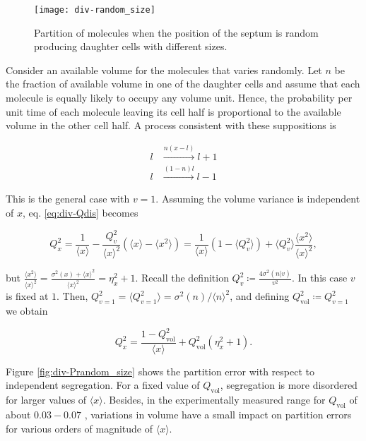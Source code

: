 \begin{figure}[H]
  \centering
  \texttt{[image: div-random\_size]}
  \caption[Partition of molecules with random size of the daughter cells]{\label{fig:div-random_size}Partition of molecules when the position of the septum is random producing daughter cells with different sizes.}
\end{figure}

Consider an available volume for the molecules that varies randomly. Let $n$ be the fraction of available volume in one of the daughter cells and assume that each molecule is equally likely to occupy any volume unit. Hence, the probability per unit time of each molecule leaving its cell half is proportional to the available volume in the other cell half. A process consistent with these suppositions is

\begin{equation*}
  \begin{split}
    l&\xrightarrow{n(x-l)}l+1\\
    l&\xrightarrow{(1-n)l}l-1
  \end{split}
\end{equation*}

This is the general case with $v=1$. Assuming the volume variance is independent of $x$, eq. \eqref{eq:div-Qdis} becomes

\begin{equation*}
  Q_x^2 = \frac{1}{\langle x\rangle} - \frac{Q_v^2}{\langle x\rangle^2}\left(\langle x\rangle  - \langle x^2\rangle\right) = \frac{1}{\langle x\rangle}\left(1-\langle Q_v^2\rangle\right) + \langle Q_v^2\rangle\frac{\langle x^2\rangle}{\langle x\rangle^2},
\end{equation*}

but $\frac{\langle x^2\rangle}{\langle x\rangle^2} = \frac{\sigma^2(x) + \langle x\rangle^2}{\langle x\rangle^2} = \eta_x^2 + 1$. Recall the definition  $Q_v^2 \coloneqq \frac{4\sigma^2(n|v)}{v^2}$. In this case $v$ is fixed at $1$. Then, $Q_{v=1}^2 = \langle Q_{v=1}^2\rangle = \sigma^2(n)/\langle n\rangle^2$, and defining $Q^2_\text{vol}\coloneqq Q_{v=1}^2$ we obtain

\begin{equation}
  \label{eq:div-Rrandom_vol}
  Q_x^2 = \frac{1-Q_\text{vol}^2}{\langle x\rangle} + Q_\text{vol}^2(\eta^2_x+1).
\end{equation}

Figure \ref{fig:div-Prandom_size} shows the partition error with respect to independent segregation. For a fixed value of $Q_\text{vol}$, segregation is more disordered for larger values of $\langle x\rangle$. Besides, in the experimentally measured range for $Q_\text{vol}$ of about $0.03 - 0.07$ \cite{huh11b}, variations in volume have a small impact on partition errors for various orders of magnitude of $\langle x\rangle$.


